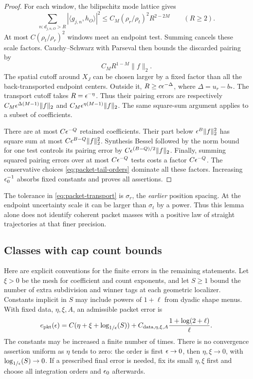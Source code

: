 \begin{proof}
For each window, the bilipschitz mode lattice gives
\[
 \sum_{n:d_{j,n,O}>R}|\langle g_{j,n},h_O\rangle|^2
 \le C_M(\rho_r/\rho_t)^2 R^{2-2M}\qquad(R\ge2).
\]
At most \(C(\rho_t/\rho_r)^2\) windows meet an endpoint test.
Summing cancels these scale factors.  Cauchy--Schwarz with Parseval
then bounds the discarded pairing by
\begin{equation}
 C_MR^{1-M}\|f\|_2.
 \label{eq:packet-summed-tail}
\end{equation}
The spatial cutoff around \(X_J\) can be chosen larger by a fixed
factor than all the back-transported endpoint centers.  Outside it,
\(R\ge c\epsilon^{-\Delta}\), where
\(\Delta=u_r-b_*\).  The transport cutoff takes
\(R=\epsilon^{-\eta}\).  Thus their pairing errors are respectively
\(C_M\epsilon^{\Delta(M-1)}\|f\|_2\) and
\(C_M\epsilon^{\eta(M-1)}\|f\|_2\).
The same square-sum argument applies to a subset of coefficients.

There are at most \(C\epsilon^{-Q}\) retained coefficients.
Their part below \(\epsilon^B\|f\|_2^2\) has square sum at most
\(C\epsilon^{B-Q}\|f\|_2^2\).  Synthesis Bessel followed by the norm
bound for one test controls its pairing error by
\(C\epsilon^{(B-Q)/2}\|f\|_2\).
Finally, summing squared pairing errors over at most
\(C\epsilon^{-Q}\) tests costs a factor \(C\epsilon^{-Q}\).
The conservative choices \eqref{eq:packet-tail-orders} dominate
all these factors.  Increasing \(\epsilon_0^{-1}\) absorbs fixed constants
and proves all assertions.
\end{proof}

The tolerance in \eqref{eq:packet-transport} is \(\sigma_r\), the
\emph{earlier} position spacing.  At the endpoint uncertainty scale it
can be larger than \(\sigma_t\) by a power.  Thus this lemma alone
does not identify coherent packet masses with a positive law of
straight trajectories at that finer precision.

\subsection{Classes with cap count bounds}

Here are explicit conventions for the finite errors in the remaining
statements.  Let \(\xi>0\) be the mesh for coefficient and count
exponents, and let \(S\ge1\) bound the number of extra subdivision
and winner tags at each geometric localizer.  Constants implicit in
\(S\) may include powers of \(1+\ell\) from dyadic shape menus.
With fixed data, \(\eta,\xi,A\), an admissible packet error is
\begin{equation}
 e_{\rm pkt}(\epsilon)=
 C(\eta+\xi+\log_{1/\epsilon}\!\left(S\right))
 +C_{\mathrm{data},\eta,\xi,A}
       \frac{1+\log(2+\ell)}{\ell}.
 \label{eq:packet-finite-error}
\end{equation}
The constants may be increased a finite number of times.  There is
no convergence assertion uniform as \(\eta\) tends to zero: the
order is first \(\epsilon\to0\), then \(\eta,\xi\to0\), with
\(\log_{1/\epsilon}\!\left(S\right)\to0\).  If a prescribed final error is needed, fix its
small \(\eta,\xi\) first and choose all integration orders and
\(\epsilon_0\) afterwards.

